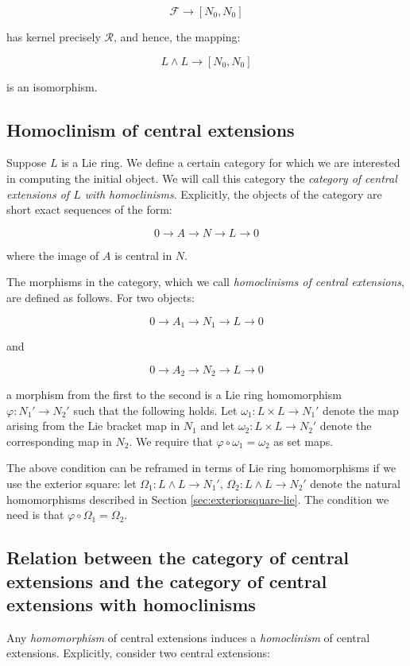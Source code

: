 $$\mathcal{F} \to [N_0,N_0]$$

has kernel precisely $\mathcal{R}$, and hence, the mapping:

$$L \wedge L \to [N_0,N_0]$$

is an isomorphism.

\subsection{Homoclinism of central extensions}\label{sec:homoclinism-central-extensions-lie}

Suppose $L$ is a Lie ring. We define a certain category for which we are
interested in computing the initial object. We will call this category
the {\em category of central extensions of $L$ with homoclinisms}. Explicitly,
the objects of the category are short exact sequences of the form:

$$0 \to A \to N \to L \to 0$$

where the image of $A$ is central in $N$.

The morphisms in the category, which we call {\em homoclinisms of
  central extensions}, are defined as follows. For two objects:

$$0 \to A_1 \to N_1 \to L \to 0$$

and

$$0 \to A_2 \to N_2 \to L \to 0$$

a morphism from the first to the second is a Lie ring homomorphism
$\varphi: N_1' \to N_2'$ such that the following holds. Let $\omega_1:
L \times L \to N_1'$ denote the map arising from the Lie bracket map in
$N_1$ and let $\omega_2: L \times L \to N_2'$ denote the corresponding
map in $N_2$. We require that $\varphi \circ \omega_1 = \omega_2$ as set maps.

The above condition can be reframed in terms of Lie ring homomorphisms if
we use the exterior square: let $\Omega_1: L \wedge L \to N_1'$,
$\Omega_2: L \wedge L \to N_2'$ denote the natural homomorphisms
described in Section \ref{sec:exteriorsquare-lie}. The condition we need
is that $\varphi \circ \Omega_1 = \Omega_2$.

\subsection{Relation between the category of central extensions and the category of central extensions with homoclinisms}

Any {\em homomorphism} of central extensions induces a {\em
  homoclinism} of central extensions. Explicitly, consider two central
extensions:

